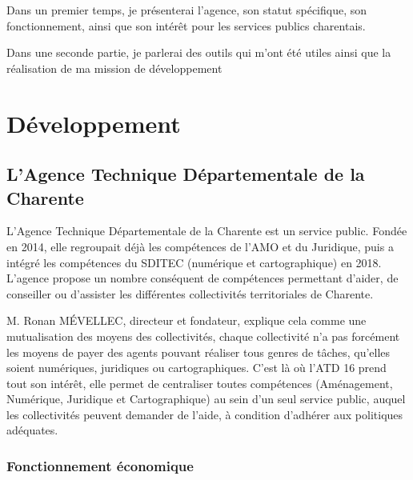 \documentclass[a4paper,12pt]{report}
\begin{document}
\vspace{1em}

Dans un premier temps, je présenterai l'agence, son statut spécifique, son fonctionnement, ainsi que son intérêt pour les services publics charentais.


Dans une seconde partie, je parlerai des outils qui m'ont été utiles ainsi que la réalisation de ma mission de développement

\chapter{Développement}

\section{L'Agence Technique Départementale de la Charente}
L'Agence Technique Départementale de la Charente est un service public. Fondée en 2014, elle regroupait déjà les compétences de l'AMO et du Juridique, puis  a intégré les compétences du SDITEC (numérique et cartographique) en 2018. L'agence propose un nombre conséquent de compétences permettant d'aider, de conseiller ou d'assister les différentes collectivités territoriales de Charente.


M. Ronan MÉVELLEC, directeur et fondateur, explique cela comme une mutualisation des moyens des collectivités, chaque collectivité n'a pas forcément les moyens de payer des agents pouvant réaliser tous genres de tâches, qu'elles soient numériques, juridiques ou cartographiques. C'est là où l'ATD 16 prend tout son intérêt, elle permet de centraliser toutes compétences (Aménagement, Numérique, Juridique et Cartographique) au sein d'un seul service public, auquel les collectivités peuvent demander de l'aide, à condition d'adhérer aux politiques adéquates.

\subsection{Fonctionnement économique}
\end{document}
